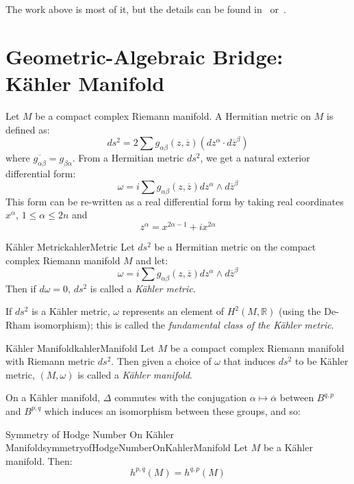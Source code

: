 \documentclass{ut-thesis}
\newenvironment{Proof}[1][]
  {\begin{ProofTcb}[#1]}
  {\end{ProofTcb}}
\newcommand{\R}{{\mathbb{R}}}
\begin{document}
\begin{Proof}
  The work above is most of it, but the details can be found in~\cite{HodgeTheory2014} or~\cite{voisinHodgeTheoryComplex2002}.
\end{Proof}



\section{Geometric-Algebraic Bridge: K\"ahler Manifold}\label{sec:kahlerMan}

Let $M$ be a compact complex Riemann manifold. A Hermitian metric on $M$ is defined as:
\[
  ds^2 = 2 \sum g_{\alpha\beta}(z, \overline{z}) (dz^\alpha \cdot d \overline{z}^\beta)
\]
where $\overline{g_{\alpha\beta}} = g_{\beta\alpha}$. From a Hermitian metric $ds^2$, we get a natural exterior
differential form:
\[
  \omega = i\sum g_{\alpha\beta}(z, \overline{z}) dz^\alpha \wedge  d \overline{z}^\beta
\]
This form can be re-written as a real differential form by taking real coordinates $x^\alpha$, $1 \le \alpha
\le 2n$ and
\[
  z^\alpha = x^{2\alpha-1} + ix^{2\alpha}
\]
\begin{defn}{K\"ahler Metric}{kahlerMetric}
  Let $ds^2$ be a Hermitian metric on the compact complex Riemann manifold $M$ and let:
  \[
    \omega = i\sum g_{\alpha\beta}(z, \overline{z}) dz^\alpha \wedge  d \overline{z}^\beta
  \]
  Then if $d\omega = 0$, $ds^2$ is called a \emph{K\"ahler metric}.
\end{defn}

If $ds^2$ is a K\"ahler metric, $\omega$ represents an element of $H^2(M, \R)$ (using the De-Rham
isomorphism); this is called the \emph{fundamental class of the K\"ahler metric}.

\begin{defn}{K\"ahler Manifold}{kahlerManifold}
  Let $M$ be a compact complex Riemann manifold with Riemann metric $ds^2$. Then given a choice of $\omega$ that
  induces $ds^2$ to be K\"ahler metric, $(M, \omega)$ is called a \emph{K\"ahler manifold}.
\end{defn}

On a K\"ahler manifold, $\Delta$ commutes with the conjugation $\alpha \mapsto \overline{\alpha}$ between
$B^{q,p}$ and $B^{p,q}$ which induces an isomorphism between these groups, and so:
\begin{thm}{Symmetry of Hodge Number On K\"ahler Manifold}{symmetryofHodgeNumberOnKahlerManifold}
  Let $M$ be a K\"ahler manifold. Then:
  \[
  h^{p,q}(M) = h^{q,p}(M)
\]
\end{thm}
\end{document}
